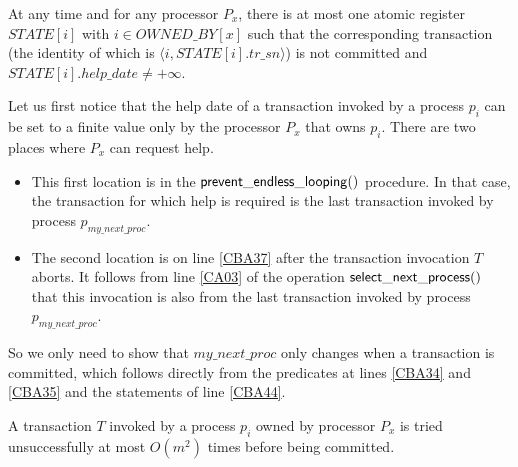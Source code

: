 \begin{lemma}
\label{lemma:1max} 
At any time and  for any processor $P_x$, there is at most one atomic register 
$\mathit{STATE}[i]$ with  $i\in \mathit{OWNED\_BY}[x]$ such that
the corresponding transaction 
(the identity of which is $\langle i, \mathit{STATE}[i].tr\_sn\rangle$)
 is not committed and $\mathit{STATE}[i].help\_date\neq +\infty$. 
\end{lemma}

\begin{proofL}
Let us first notice  that the  help date of a transaction invoked by a 
process $p_i$ can be set to  a finite value  only by the  processor $P_x$ 
that owns $p_i$.  There are two places where $P_x$  can request help. 
\begin{itemize}
\item 
This first location is in  the ${\sf prevent\_endless\_looping}()$ procedure.
In that  case, the  transaction  for which  help  is required is  the last
transaction invoked by  process $p_{my\_next\_proc}$. 
\item 
The second  location is on line  \ref{CBA37} after the  transaction 
invocation  $T$ aborts. 
It follows from line \ref{CA03} of  the operation ${\sf  select\_next\_process}()$   
that  this invocation is also from  the last
transaction invoked by  process $p_{my\_next\_proc}$. 
\end{itemize}
So  we  only  need  to  show  that $my\_next\_proc$  only  changes  when  a
transaction is committed, which  follows directly from the predicates at lines 
 \ref{CBA34} and  \ref{CBA35} and the statements of line  \ref{CBA44}. 
\renewcommand{\toto}{lemma:1max}
\end{proofL}   

\begin{theorem}
\label{proof:try-bounds}
A transaction $T$  invoked by a process $p_i$ owned by processor  $P_x$ 
is tried unsuccessfully  at most $O(m^2)$  times  before being  committed.
\end{theorem}


